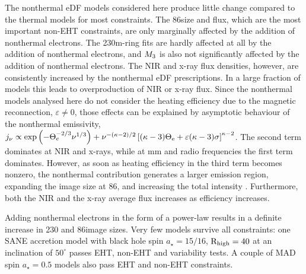{The nonthermal eDF models considered here produce little change compared to the thermal models for most constraints.  The 86\GHz size and flux, which are the most important non-EHT constraints, are only marginally affected by the addition of nonthermal electrons.
The 230\GHz m-ring fits are hardly affected at all by the addition of nonthermal electrons, and $M_{3}$ is also not significantly affected by the addition of nonthermal electrons.  The NIR and x-ray flux densities, however, are consistently increased by the nonthermal eDF prescriptions.  In a large fraction of models this leads to overproduction of NIR or x-ray flux. Since the nonthermal models analysed here do not consider the heating efficiency due to the magnetic reconnection, $\varepsilon \neq 0$, those effects can be explained by asymptotic behaviour of the nonthermal emissivity, $ j_{\nu}\propto\exp\left(-\Theta_e^{-2/3}\nu^{1/3}\right)+\nu^{-(\kappa-2)/2} \left[(\kappa -3)\Theta_{\rm e} + \varepsilon(\kappa -3) \sigma\right]^{\kappa-2}$. The second term dominates at NIR and x-rays, while at mm and radio frequencies the first term dominates. However, as soon as heating efficiency in the third term becomes nonzero, the nonthermal contribution generates a larger emission region, expanding the image size at 86\GHz,  and increasing the total intensity \citep{2021NatAs.tmp..218C,2021arXiv211102518F}. Furthermore, both the NIR and the x-ray average flux increases as efficiency increases. 


Adding nonthermal electrons in the form of a power-law results in a definite increase in 230 and 86\GHz image sizes. Very few models survive all constraints: one SANE accretion model with black hole spin $a_{\star}=15/16$, $\rm R_{high}=40$ at an inclination of $50^{\circ}$ passes EHT, non-EHT and variability tests. A couple of MAD spin $a_{\star}=0.5$ models also pass EHT and non-EHT constraints.


}
